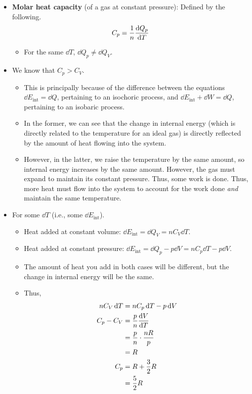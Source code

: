 \documentclass[../notes.tex]{subfiles}
\begin{document}
\begin{itemize}
\begin{itemize}
    \end{itemize}
    \item \textbf{Molar heat capacity} (of a gas at constant pressure): Defined by the following.
    \begin{equation*}
        C_p = \frac{1}{n}\dv{Q_p}{T}
    \end{equation*}
    \begin{itemize}
        \item For the same $\dd{T}$, $\dd{Q_p}\neq\dd{Q_V}$.
    \end{itemize}
    \item We know that $C_p>C_V$.
    \begin{itemize}
        \item This is principally because of the difference between the equations $\dd{E_\text{int}}=\dd{Q}$, pertaining to an isochoric process, and $\dd{E_\text{int}}+\dd{W}=\dd{Q}$, pertaining to an isobaric process.
        \item In the former, we can see that the change in internal energy (which is directly related to the temperature for an ideal gas) is directly reflected by the amount of heat flowing into the system.
        \item However, in the latter, we raise the temperature by the same amount, so internal energy increases by the same amount. However, the gas must expand to maintain its constant pressure. Thus, some work is done. Thus, more heat must flow into the system to account for the work done \emph{and} maintain the same temperature.
    \end{itemize}
    \item For some $\dd{T}$ (i.e., some $\dd{E_\text{int}}$).
    \begin{itemize}
        \item Heat added at constant volume: $\dd{E_\text{int}}=\dd{Q_V}=nC_V\dd{T}$.
        \item Heat added at constant pressure: $\dd{E_\text{int}}=\dd{Q_p}-p\dd{V}=nC_p\dd{T}-p\dd{V}$.
        \item The amount of heat you add in both cases will be different, but the change in internal energy will be the same.
        \item Thus,
        \begin{align*}
            nC_V\dd{T} &= nC_p\dd{T}-p\dd{V}\\
            C_p-C_V &= \frac{p}{n}\dv{V}{T}\\
            &= \frac{p}{n}\cdot\frac{nR}{p}\\
            &= R\\
            C_p &= R+\frac{3}{2}R\\
            &= \frac{5}{2}R
        \end{align*}
    \end{itemize}
\end{itemize}
\end{document}
